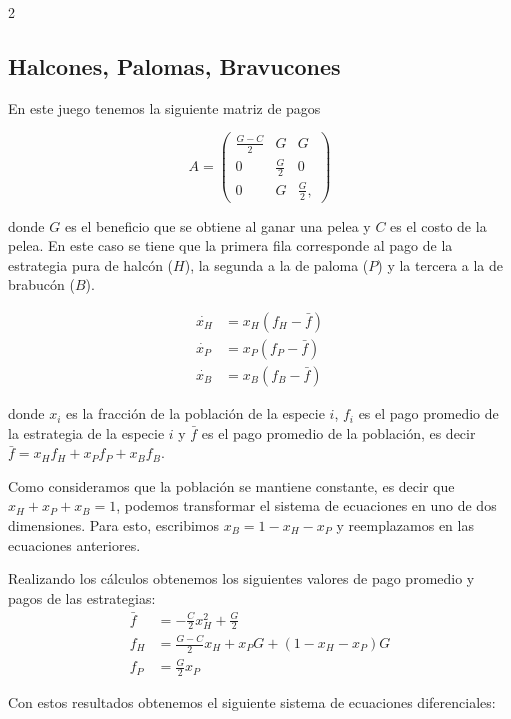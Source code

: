 \documentclass[spanish, 12pt, a4paper]{article}
\begin{document}
\begin{multicols}{2}
\subsection{Halcones, Palomas, Bravucones}

En este juego tenemos la siguiente matriz de pagos

\begin{equation}
    A = \begin{pmatrix}
        \frac{G-C}{2} & G & G \\
        0 & \frac{G}{2} & 0 \\
        0 & G & \frac{G}{2},
    \end{pmatrix}
\end{equation}

donde $G$ es el beneficio que se obtiene al ganar una pelea y $C$ es el costo de la pelea. En este caso se tiene que la primera fila corresponde al pago de la estrategia pura de halcón ($H$), la segunda a la de paloma ($P$) y la tercera a la de brabucón ($B$).

\begin{align}
    \dot{x_H} &= x_H \left( f_H - \bar{f}\right) \\
    \dot{x_P} &= x_P \left( f_P - \bar{f}\right) \\
    \dot{x_B} &= x_B \left( f_B - \bar{f}\right)
\end{align}

donde $x_i$ es la fracción de la población de la especie $i$, $f_i$ es el pago promedio de la estrategia de la especie $i$ y $\bar{f}$ es el pago promedio de la población, es decir $\bar{f} = x_H f_H + x_P f_P + x_B f_B$.

Como consideramos que la población se mantiene constante, es decir que $x_H + x_P + x_B = 1$, podemos transformar el sistema de ecuaciones en uno de dos dimensiones. Para esto, escribimos $x_B = 1 - x_H - x_P$ y reemplazamos en las ecuaciones anteriores.

Realizando los cálculos obtenemos los siguientes valores de pago promedio y pagos de las estrategias:
\begin{align*}
    \bar{f} &= - \frac{C}{2} x_H^2 + \frac{G}{2} \\
    f_H &= \frac{G-C}{2} x_H + x_P G + \left(1 - x_H - x_P\right) G \\
    f_P &= \frac{G}{2} x_P
\end{align*}

Con estos resultados obtenemos el siguiente sistema de ecuaciones diferenciales:


\end{multicols}
\end{document}
